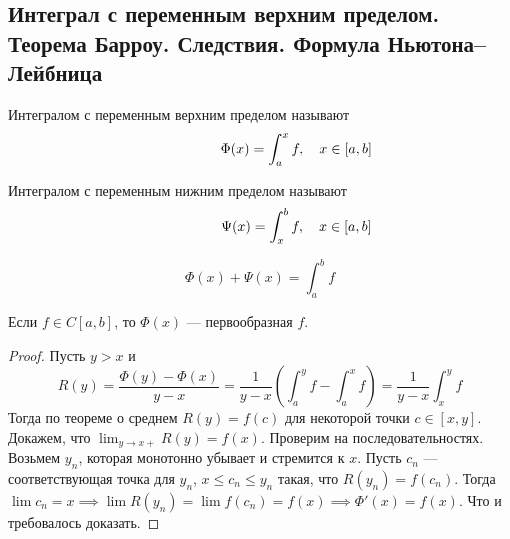 \subsection{Интеграл с переменным верхним пределом. Теорема Барроу. Следствия. Формула Ньютона–Лейбница}
\begin{conj}
  Интегралом с переменным верхним пределом называют
  \begin{equation*}
    \hphantom{, \quad x \in [a, b]}
    \Phi(x) = \int_{a}^{x} f
    , \quad x \in [a, b]
  \end{equation*}
\end{conj}

\begin{conj}
    Интегралом с переменным нижним пределом называют
    \begin{equation*}
      \hphantom{, \quad x \in [a, b]}
      \Psi(x) = \int_{x}^{b} f
      , \quad x \in [a, b]
    \end{equation*}
\end{conj}

\begin{notice}
    \begin{equation*}
      \Phi(x) + \Psi(x) = \int_{a}^{b} f
    \end{equation*}
\end{notice}

\begin{theorem}[Барроу]
    Если $f \in C[a, b]$, то $\Phi(x)$ --- первообразная $f$.
\end{theorem}
\begin{proof}
    Пусть $y > x$ и
    \begin{equation*}
      R(y) = \frac{\Phi(y) - \Phi(x)}{y - x} = \frac{1}{y - x}\left(\int_{a}^{y} f - \int_{a}^{x} f\right) = \frac{1}{y - x}\int_{x}^{y} f
    \end{equation*}
    Тогда по теореме о среднем $R(y) = f(c)$ для некоторой точки $c \in [x, y]$. Докажем, что $\lim_{y \to x+} R(y) = f(x)$. Проверим на последовательностях. Возьмем $y_n$, которая монотонно убывает и стремится к $x$. Пусть $c_n$ --- соответствующая точка для $y_n$,\; $x \leq c_n \leq y_n$ такая, что $R(y_n) = f(c_n)$. Тогда $\lim c_n = x \implies \lim R(y_n) = \lim f(c_n) = f(x) \implies \Phi'(x) = f(x)$. Что и требовалось доказать.
\end{proof}


